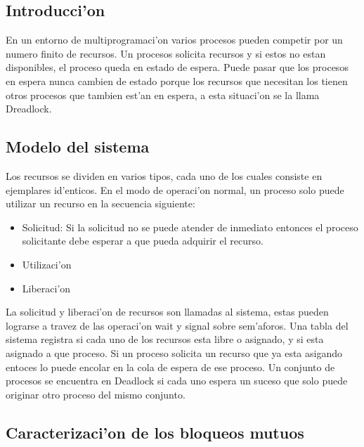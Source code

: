 \subsection{Introducci'on}
En un entorno de multiprogramaci'on varios procesos pueden competir por un numero finito de recursos. Un procesos solicita recursos y si estos no estan disponibles, el proceso queda en estado de espera. Puede pasar que los procesos en espera nunca cambien de estado porque los recursos que necesitan los tienen otros procesos que tambien est'an en espera, a esta situaci'on se la llama Dreadlock.

\subsection{Modelo del sistema}
Los recursos se dividen en varios tipos, cada uno de los cuales consiste en ejemplares id'enticos. 
En el modo de operaci'on normal, un proceso solo puede utilizar un recurso en la secuencia siguiente:
\begin{itemize}
 \item Solicitud: Si la solicitud no se puede atender de inmediato entonces el proceso solicitante debe esperar a que pueda adquirir el recurso.
 \item Utilizaci'on
 \item Liberaci'on
\end{itemize}
La solicitud y liberaci'on de recursos son llamadas al sistema, estas pueden lograrse a travez de las operaci'on wait y signal sobre sem'aforos.
Una tabla del sistema registra si cada uno de los recursos esta libre o asignado, y si esta asignado a que proceso. Si un proceso solicita un recurso que ya esta asigando entoces lo puede encolar en la cola de espera de ese proceso.
Un conjunto de procesos se encuentra en Deadlock si cada uno espera un suceso que solo puede originar otro proceso del mismo conjunto.

\subsection{Caracterizaci'on de los bloqueos mutuos}
